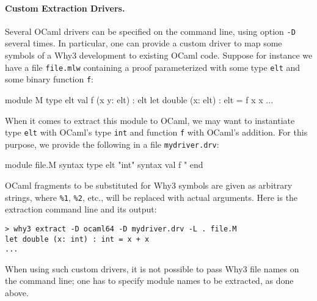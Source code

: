 \paragraph{Custom Extraction Drivers.}
Several OCaml drivers can be specified on the command line, using
option \texttt{-D} several times. In particular, one can provide
a custom driver to map some symbols of a Why3 development to existing
OCaml code. Suppose for instance we have a file \texttt{file.mlw}
containing a proof parameterized with some type \texttt{elt} and some
binary function \texttt{f}:
\begin{whycode}
module M
  type elt
  val f (x y: elt) : elt
  let double (x: elt) : elt = f x x
  ...
\end{whycode}
When it comes to extract this module to OCaml, we may want to
instantiate type \texttt{elt} with OCaml's type \texttt{int} and
function \texttt{f} with OCaml's addition. For this purpose, we
provide the following in a file \texttt{mydriver.drv}:
\begin{whycode}
module file.M
  syntax type elt "int"
  syntax val  f   "%
end
\end{whycode}
OCaml fragments to be substituted for Why3 symbols are given as
arbitrary strings, where \verb+%1+, \verb+%2+, etc., will be replaced
with actual arguments.
Here is the extraction command line and its output:
\begin{verbatim}
> why3 extract -D ocaml64 -D mydriver.drv -L . file.M
let double (x: int) : int = x + x
...
\end{verbatim}
When using such custom drivers, it is not possible to pass Why3 file
names on the command line; one has to specify module names to be
extracted, as done above.

